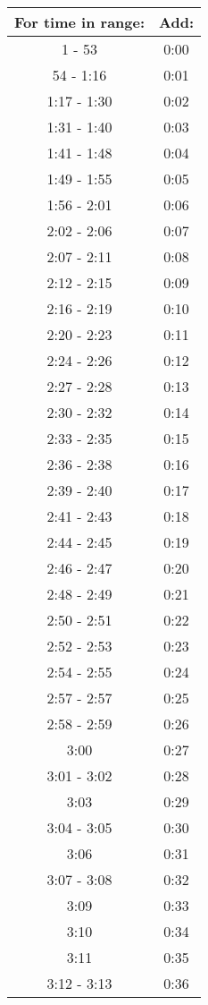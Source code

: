 	\begin{minipage}{0.5\textwidth}
\begin{tabular}[t]{c|c}
	For time in range: & Add: \\\hline
	1 - 53 & 0:00 \\\hline
	54 - 1:16 & 0:01 \\\hline
	1:17 - 1:30 & 0:02 \\\hline
	1:31 - 1:40 & 0:03 \\\hline
	1:41 - 1:48 & 0:04 \\\hline
	1:49 - 1:55 & 0:05 \\\hline
	1:56 - 2:01 & 0:06 \\\hline
	2:02 - 2:06 & 0:07 \\\hline
	2:07 - 2:11 & 0:08 \\\hline
	2:12 - 2:15 & 0:09 \\\hline
	2:16 - 2:19 & 0:10 \\\hline
	2:20 - 2:23 & 0:11 \\\hline
	2:24 - 2:26 & 0:12 \\\hline
	2:27 - 2:28 & 0:13 \\\hline
	2:30 - 2:32 & 0:14 \\\hline
	2:33 - 2:35 & 0:15 \\\hline
	2:36 - 2:38 & 0:16 \\\hline
	2:39 - 2:40 & 0:17 \\\hline
	2:41 - 2:43 & 0:18 \\\hline
	2:44 - 2:45 & 0:19 \\\hline
	2:46 - 2:47 & 0:20 \\\hline
	2:48 - 2:49 & 0:21 \\\hline
	2:50 - 2:51 & 0:22 \\\hline
	2:52 - 2:53 & 0:23 \\\hline
	2:54 - 2:55 & 0:24 \\\hline
	2:57 - 2:57 & 0:25 \\\hline
	2:58 - 2:59 & 0:26 \\\hline
	3:00  & 0:27 \\\hline
	3:01 - 3:02 & 0:28 \\\hline
	3:03 & 0:29 \\\hline
	3:04 - 3:05 & 0:30 \\\hline
	3:06 & 0:31 \\\hline
	3:07 - 3:08 & 0:32 \\\hline
	3:09 & 0:33 \\\hline
	3:10 & 0:34 \\\hline
	3:11 & 0:35 \\\hline
	3:12 - 3:13 & 0:36 \\\hline
	\end{tabular}\end{minipage}
